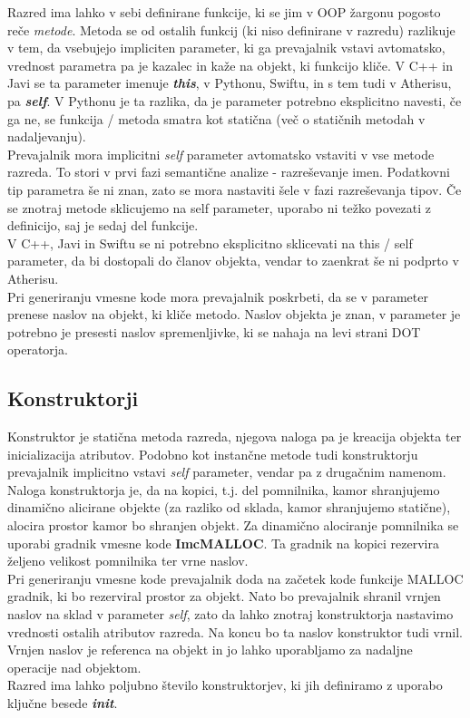 \documentclass[a4paper, 12pt]{book}
\begin{document}
Razred ima lahko v sebi definirane funkcije, ki se jim v OOP žargonu pogosto reče \textit{metode}. Metoda se od ostalih funkcij (ki niso definirane v razredu) razlikuje v tem, da vsebujejo impliciten parameter, ki ga prevajalnik vstavi avtomatsko, vrednost parametra pa je kazalec in kaže na objekt, ki funkcijo kliče. V C++ in Javi se ta parameter imenuje \textbf{\textit{this}}, v Pythonu, Swiftu, in s tem tudi v Atherisu, pa \textbf{\textit{self}}. V Pythonu je ta razlika, da je parameter potrebno eksplicitno navesti, če ga ne, se funkcija / metoda smatra kot statična (več o statičnih metodah v nadaljevanju). \\
\indent Prevajalnik mora implicitni \textit{self} parameter avtomatsko vstaviti v vse metode razreda. To stori v prvi fazi semantične analize - razreševanje imen. Podatkovni tip parametra še ni znan, zato se mora nastaviti šele v fazi razreševanja tipov. Če se znotraj metode sklicujemo na self parameter, uporabo ni težko povezati z definicijo, saj je sedaj del funkcije. \\
\indent V C++, Javi in Swiftu se ni potrebno eksplicitno sklicevati na this / self parameter, da bi dostopali do članov objekta, vendar to zaenkrat še ni podprto v Atherisu. \\
\indent Pri generiranju vmesne kode mora prevajalnik poskrbeti, da se v parameter prenese naslov na objekt, ki kliče metodo. Naslov objekta je znan, v parameter je potrebno je  presesti naslov spremenljivke, ki se nahaja na levi strani DOT operatorja.

\subsection{Konstruktorji}

Konstruktor je statična metoda razreda, njegova naloga pa je kreacija objekta ter inicializacija atributov. Podobno kot instančne metode tudi konstruktorju prevajalnik implicitno vstavi \textit{self} parameter, vendar pa z drugačnim namenom. \\
\indent Naloga konstruktorja je, da na kopici, t.j. del pomnilnika, kamor shranjujemo dinamično alicirane objekte (za razliko od sklada, kamor shranjujemo statične), alocira prostor kamor bo shranjen objekt. Za dinamično alociranje pomnilnika se uporabi gradnik vmesne kode \textbf{ImcMALLOC}. Ta gradnik na kopici rezervira željeno velikost pomnilnika ter vrne naslov. \\
\indent Pri generiranju vmesne kode prevajalnik doda na začetek kode funkcije MALLOC gradnik, ki bo rezerviral prostor za objekt. Nato bo prevajalnik shranil vrnjen naslov na sklad v parameter \textit{self}, zato da lahko znotraj konstruktorja nastavimo vrednosti ostalih atributov razreda. Na koncu bo ta naslov konstruktor tudi vrnil. Vrnjen naslov je referenca na objekt in jo lahko uporabljamo za nadaljne operacije nad objektom. \\
\indent Razred ima lahko poljubno število konstruktorjev, ki jih definiramo z uporabo ključne besede \textit{\textbf{init}}.
\end{document}
